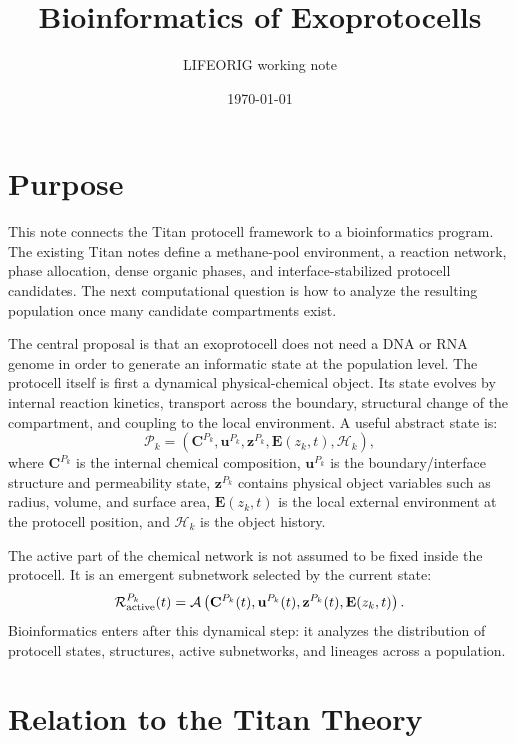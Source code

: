 \documentclass[11pt]{article}
\title{Bioinformatics of Exoprotocells}
\author{LIFEORIG working note}
\date{\today}
\begin{document}
\maketitle

\section{Purpose}

This note connects the Titan protocell framework to a bioinformatics program. The existing Titan notes define a methane-pool environment, a reaction network, phase allocation, dense organic phases, and interface-stabilized protocell candidates. The next computational question is how to analyze the resulting population once many candidate compartments exist.

The central proposal is that an exoprotocell does not need a DNA or RNA genome in order to generate an informatic state at the population level. The protocell itself is first a dynamical physical-chemical object. Its state evolves by internal reaction kinetics, transport across the boundary, structural change of the compartment, and coupling to the local environment. A useful abstract state is:
\begin{equation}
\mathcal{P}_k =
\left(
\mathbf{C}^{P_k},
\mathbf{u}^{P_k},
\mathbf{z}^{P_k},
\mathbf{E}(z_k,t),
\mathcal{H}_k
\right),
\end{equation}
where $\mathbf{C}^{P_k}$ is the internal chemical composition, $\mathbf{u}^{P_k}$ is the boundary/interface structure and permeability state, $\mathbf{z}^{P_k}$ contains physical object variables such as radius, volume, and surface area, $\mathbf{E}(z_k,t)$ is the local external environment at the protocell position, and $\mathcal{H}_k$ is the object history.

The active part of the chemical network is not assumed to be fixed inside the protocell. It is an emergent subnetwork selected by the current state:
\begin{equation}
\mathcal{R}_{\rm active}^{P_k}(t)
=
\mathcal{A}
\left(
\mathbf{C}^{P_k}(t),
\mathbf{u}^{P_k}(t),
\mathbf{z}^{P_k}(t),
\mathbf{E}(z_k,t)
\right).
\end{equation}
Bioinformatics enters after this dynamical step: it analyzes the distribution of protocell states, structures, active subnetworks, and lineages across a population.

\section{Relation to the Titan Theory}
\end{document}
